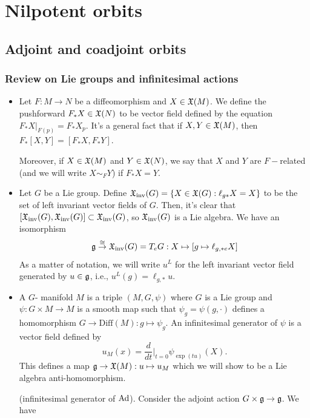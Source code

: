 \chapter{Nilpotent orbits}
\section{Adjoint and coadjoint orbits}
\subsection{Review on Lie groups and infinitesimal actions}
\begin{itemize}
    \item Let $F:M\rightarrow N$ be a diffeomorphism and $X\in\mathfrak{X}(M)$. We define the pushforward 
    $F_*X\in\mathfrak{X}(N)$ to be vector field defined by the equation $F_*X |_{F(p)}=F_*X_p$. It's a general fact that 
    if $X,Y\in\mathfrak{X}(M)$, then $F_*[X,Y]=[F_*X,F_*Y]$.\par 
    Moreover, if $X\in\mathfrak{X}(M)$ and $Y\in\mathfrak{X}(N)$, we say that $X$ and $Y$ are $F-$related (and we will write 
    $X\sim_FY$) if $F_*X=Y$.
    \item Let $G$ be a Lie group. Define $\mathfrak{X}_{\text{inv}}(G)=\{X\in\mathfrak{X}(G):\ell_{g*}X=X\}$ to be the set of 
    left invariant vector fields of $G$. Then, it's clear that 
    $[\mathfrak{X}_{\text{inv}}(G),\mathfrak{X}_{\text{inv}}(G)]\subset \mathfrak{X}_{\text{inv}}(G)$, so $\mathfrak{X}_{\text{inv}}(G)$ is a 
    Lie algebra. We have an isomorphism 
    \begin{equation}
        \mathfrak{g}\overset{\cong}{\to}\mathfrak{X}_{\text{inv}}(G)=T_eG: X\mapsto [g\mapsto \ell_{g,*e}X]
    \end{equation}
    As a matter of notation, we will write $u^L$ for the left invariant vector field generated by $u\in\mathfrak{g}$, i.e.,
    $u^L(g)=\ell_{g,*}u$.
    \item A $G$- manifold $M$ is a triple $(M,G,\psi)$ where $G$ is a Lie group and 
    $\psi:G\times M\to M$ is a smooth map such that $\psi_g=\psi(g,\cdot)$ defines a homomorphism 
    $G\to\text{Diff}(M):g\mapsto \psi_g$. An infinitesimal generator of $\psi$ is a vector field defined by 
    \begin{equation}
        u_M(x)=\frac{d}{dt}\bigg|_{t=0}\psi_{\exp(tu)}(X).
    \end{equation}
    This defines a map $\mathfrak{g}\to\mathfrak{X}(M):u\mapsto u_M$ which we will show to be a Lie algebra anti-homomorphism.
    \begin{example}
        (infinitesimal generator of $\text{Ad}$). Consider the adjoint action $G\times\mathfrak{g}\to\mathfrak{g}$. We have 

\end{example}
\end{itemize}
